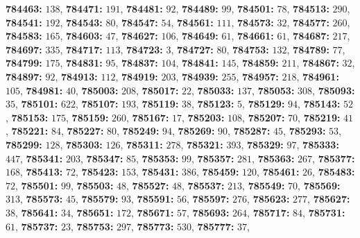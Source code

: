 \textsf{\bfseries 784463:} $138$, \textsf{\bfseries 784471:} $191$, \textsf{\bfseries 784481:} $92$, \textsf{\bfseries 784489:} $99$, \textsf{\bfseries 784501:} $78$, \textsf{\bfseries 784513:} $290$, \textsf{\bfseries 784541:} $192$, \textsf{\bfseries 784543:} $80$, \textsf{\bfseries 784547:} $54$, \textsf{\bfseries 784561:} $111$, \textsf{\bfseries 784573:} $32$, \textsf{\bfseries 784577:} $260$, \textsf{\bfseries 784583:} $165$, \textsf{\bfseries 784603:} $47$, \textsf{\bfseries 784627:} $106$, \textsf{\bfseries 784649:} $61$, \textsf{\bfseries 784661:} $61$, \textsf{\bfseries 784687:} $217$, \textsf{\bfseries 784697:} $335$, \textsf{\bfseries 784717:} $113$, \textsf{\bfseries 784723:} $3$, \textsf{\bfseries 784727:} $80$, \textsf{\bfseries 784753:} $132$, \textsf{\bfseries 784789:} $77$, \textsf{\bfseries 784799:} $175$, \textsf{\bfseries 784831:} $95$, \textsf{\bfseries 784837:} $104$, \textsf{\bfseries 784841:} $145$, \textsf{\bfseries 784859:} $211$, \textsf{\bfseries 784867:} $32$, \textsf{\bfseries 784897:} $92$, \textsf{\bfseries 784913:} $112$, \textsf{\bfseries 784919:} $203$, \textsf{\bfseries 784939:} $255$, \textsf{\bfseries 784957:} $218$, \textsf{\bfseries 784961:} $105$, \textsf{\bfseries 784981:} $40$, \textsf{\bfseries 785003:} $208$, \textsf{\bfseries 785017:} $22$, \textsf{\bfseries 785033:} $137$, \textsf{\bfseries 785053:} $308$, \textsf{\bfseries 785093:} $35$, \textsf{\bfseries 785101:} $622$, \textsf{\bfseries 785107:} $193$, \textsf{\bfseries 785119:} $38$, \textsf{\bfseries 785123:} $5$, \textsf{\bfseries 785129:} $94$, \textsf{\bfseries 785143:} $52$, \textsf{\bfseries 785153:} $175$, \textsf{\bfseries 785159:} $260$, \textsf{\bfseries 785167:} $17$, \textsf{\bfseries 785203:} $108$, \textsf{\bfseries 785207:} $70$, \textsf{\bfseries 785219:} $41$, \textsf{\bfseries 785221:} $84$, \textsf{\bfseries 785227:} $80$, \textsf{\bfseries 785249:} $94$, \textsf{\bfseries 785269:} $90$, \textsf{\bfseries 785287:} $45$, \textsf{\bfseries 785293:} $53$, \textsf{\bfseries 785299:} $128$, \textsf{\bfseries 785303:} $126$, \textsf{\bfseries 785311:} $278$, \textsf{\bfseries 785321:} $393$, \textsf{\bfseries 785329:} $97$, \textsf{\bfseries 785333:} $447$, \textsf{\bfseries 785341:} $203$, \textsf{\bfseries 785347:} $85$, \textsf{\bfseries 785353:} $99$, \textsf{\bfseries 785357:} $281$, \textsf{\bfseries 785363:} $267$, \textsf{\bfseries 785377:} $168$, \textsf{\bfseries 785413:} $72$, \textsf{\bfseries 785423:} $153$, \textsf{\bfseries 785431:} $386$, \textsf{\bfseries 785459:} $120$, \textsf{\bfseries 785461:} $26$, \textsf{\bfseries 785483:} $72$, \textsf{\bfseries 785501:} $99$, \textsf{\bfseries 785503:} $48$, \textsf{\bfseries 785527:} $48$, \textsf{\bfseries 785537:} $213$, \textsf{\bfseries 785549:} $70$, \textsf{\bfseries 785569:} $313$, \textsf{\bfseries 785573:} $45$, \textsf{\bfseries 785579:} $93$, \textsf{\bfseries 785591:} $56$, \textsf{\bfseries 785597:} $276$, \textsf{\bfseries 785623:} $277$, \textsf{\bfseries 785627:} $38$, \textsf{\bfseries 785641:} $34$, \textsf{\bfseries 785651:} $172$, \textsf{\bfseries 785671:} $57$, \textsf{\bfseries 785693:} $264$, \textsf{\bfseries 785717:} $84$, \textsf{\bfseries 785731:} $61$, \textsf{\bfseries 785737:} $23$, \textsf{\bfseries 785753:} $297$, \textsf{\bfseries 785773:} $530$, \textsf{\bfseries 785777:} $37$, 
